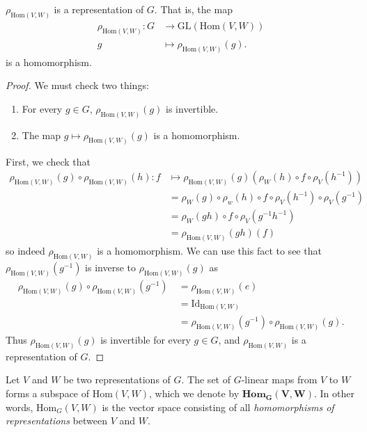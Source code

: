 \begin{prop} $\rho_{\text{Hom}(V,W)}$ is a representation of $G$.  That is, the map		
\begin{align*}		
  \rho_{\text{Hom}(V,W)} \colon G &\to \text{GL}(\text{Hom}(V,W)) \\		
g &\mapsto \rho_{\text{Hom}(V,W)}(g).		
\end{align*}		
 is a homomorphism.		
\end{prop}		
\begin{proof}		
We must check two things:		
\begin{enumerate}			
\item For every $g \in G$,  $\rho_{\text{Hom}(V,W)}(g)$ is invertible.	
\item The map $g \mapsto  \rho_{\text{Hom}(V,W)}(g)$ is a homomorphism.	
\end{enumerate}		
First, we check that
\begin{align*}
\rho_{\text{Hom}(V,W)}(g) \circ \rho_{\text{Hom}(V,W)}(h) \colon f &\mapsto \rho_{\text{Hom}(V,W)} (g) ( \rho_W (h) \circ f \circ \rho_V (h^ {-1})) \\
&= \rho_W (g) \circ \rho_w (h) \circ f \circ \rho_V (h^{-1} ) \circ \rho_V(g^{-1}) \\
&= \rho_W (gh) \circ f \circ \rho_V (g ^{-1} h ^{-1}) \\
&= \rho_{\text{Hom}(V,W)}(gh)(f)
\end{align*}
so indeed $\rho_{\text{Hom}(V,W)}$ is a homomorphism.  We can use this fact to see that $\rho_{\text{Hom}(V,W)}(g^{-1})$ is inverse to $\rho_{\text{Hom}(V,W)}(g)$ as
\begin{align*}
\rho_{\text{Hom}(V,W)}(g) \circ \rho_{\text{Hom}(V,W)}(g^{-1}) \ &= \rho_{\text{Hom}(V,W)} (e) \\ 
&= \text{Id}_{\text{Hom}(V,W)} \\
&= \rho_{\text{Hom}(V,W)}(g^{-1}) \circ \rho_{\text{Hom}(V,W)}(g).
\end{align*}
Thus $\rho_{\text{Hom}(V,W)}(g)$ is invertible for every $g \in G$, and $\rho_{\text{Hom}(V,W)}$ is a representation of $G$.
\end{proof}

\begin{defn}		
Let $V$ and $W$ be two representations of $G$.  The set of $G$-linear maps from $V$ to $W$ forms a subspace of $\text{Hom}(V,W)$, which we denote by $\textbf{Hom}_\mathbf{G}\mathbf{(V,W)}$.  In other words, $\text{Hom}_{G}(V,W)$ is the vector space consisting of all \textit{homomorphisms of representations} between $V$ and $W$. 
\end{defn} 

